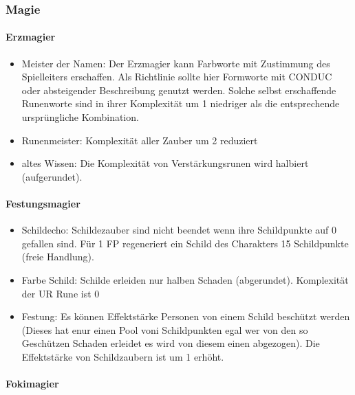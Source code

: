 \documentclass{article}
\begin{document}
\subsubsection{Magie}

\paragraph{Erzmagier }

\begin{itemize}
\item Meister der Namen: Der Erzmagier kann Farbworte mit Zustimmung des Spielleiters erschaffen. Als Richtlinie sollte hier Formworte mit CONDUC oder absteigender Beschreibung genutzt werden. Solche selbst erschaffende Runenworte sind in ihrer Komplexität um 1 niedriger als die entsprechende ursprüngliche Kombination.
\item Runenmeister: Komplexität aller Zauber um 2 reduziert
\item altes Wissen: Die Komplexität von Verstärkungsrunen wird halbiert (aufgerundet).
\end{itemize}

\paragraph{Festungsmagier}

\begin{itemize}
\item Schildecho: Schildezauber sind nicht beendet wenn ihre Schildpunkte auf 0 gefallen sind. Für 1 FP regeneriert ein Schild des Charakters 15 Schildpunkte (freie Handlung).
\item Farbe Schild: Schilde erleiden nur halben Schaden (abgerundet). Komplexität der UR Rune ist 0
\item Festung: Es können Effektstärke Personen von einem Schild beschützt werden (Dieses hat enur einen Pool voni Schildpunkten egal wer von den so Geschützen Schaden erleidet es wird von diesem einen abgezogen). Die Effektstärke von Schildzaubern ist um 1 erhöht.
\end{itemize}

\paragraph{Fokimagier}
\end{document}
